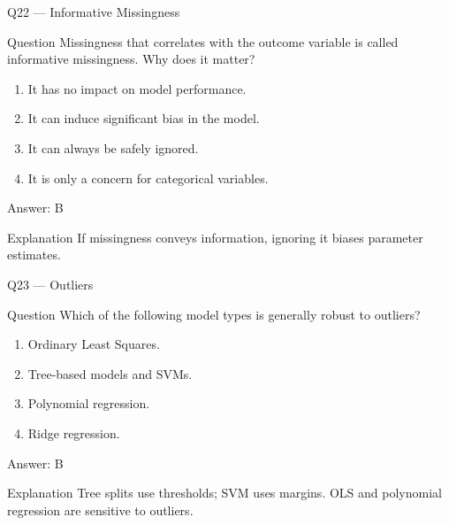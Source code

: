 \documentclass[aspectratio=169,8pt]{beamer}
\begin{document}
	\begin{frame}{Q22 --- Informative Missingness}
		\begin{block}{Question}
			Missingness that correlates with the outcome variable is called informative missingness. Why does it matter?
		\end{block}
		\begin{enumerate}
			\item It has no impact on model performance.
			\item It can induce significant bias in the model.
			\item It can always be safely ignored.
			\item It is only a concern for categorical variables.
		\end{enumerate}
		\begin{exampleblock}{Answer: B}\end{exampleblock}
		\begin{block}{Explanation}
			If missingness conveys information, ignoring it biases parameter estimates.
		\end{block}
	\end{frame}
	
	\begin{frame}{Q23 --- Outliers}
		\begin{block}{Question}
			Which of the following model types is generally robust to outliers?
		\end{block}
		\begin{enumerate}
			\item Ordinary Least Squares.
			\item Tree-based models and SVMs.
			\item Polynomial regression.
			\item Ridge regression.
		\end{enumerate}
		\begin{exampleblock}{Answer: B}\end{exampleblock}
		\begin{block}{Explanation}
			Tree splits use thresholds; SVM uses margins. OLS and polynomial regression are sensitive to outliers.
		\end{block}
	\end{frame}
	
\end{document}
